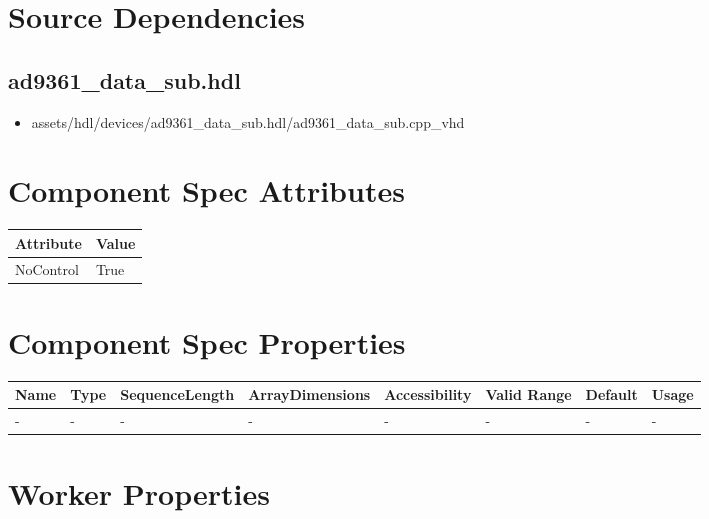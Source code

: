 \documentclass{article}
\def\comp{ad9361\_data\_sub}
\begin{document}
\section*{Source Dependencies}
\subsection*{\comp.hdl}
\begin{itemize}
	\item assets/hdl/devices/\comp.hdl/\comp.cpp\_vhd
\end{itemize}
\begin{landscape}

	\section*{Component Spec Attributes}
	\begin{scriptsize}
		\begin{tabular}{|p{3.75cm}|p{18.84cm}|}
			\hline
			\rowcolor{blue}
			Attribute & Value \\
			\hline
			NoControl & True \\
			\hline
		\end{tabular}
	\end{scriptsize}

	\section*{Component Spec Properties}
	\begin{scriptsize}
		\begin{tabular}{|p{3.75cm}|p{1.25cm}|p{2cm}|p{2.75cm}|p{1.5cm}|p{1.5cm}|p{1cm}|p{6.23cm}|}
			\hline
			\rowcolor{blue}
			Name               & Type & SequenceLength & ArrayDimensions & Accessibility      & Valid Range & Default & Usage                                                                               \\
			\hline
			- & - & - & - & - & - & - & - \\
			\hline
		\end{tabular}
	\end{scriptsize}

	\section*{Worker Properties}

\end{landscape}
\end{document}
